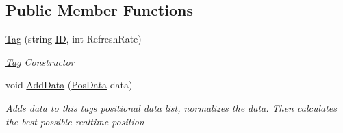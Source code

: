 \subsection*{Public Member Functions}
\begin{DoxyCompactItemize}
\item 
\hyperlink{class_pozyx_positioner_1_1_framework_1_1_tag_a9b58a1a5756bf3c8cda1e2afd32276b2}{Tag} (string \hyperlink{class_pozyx_positioner_1_1_framework_1_1_tag_a0d75eeca4dea7088e2b4a60230c13012}{ID}, int Refresh\+Rate)
\begin{DoxyCompactList}\small\item\em \hyperlink{class_pozyx_positioner_1_1_framework_1_1_tag}{Tag} Constructor \end{DoxyCompactList}\item 
void \hyperlink{class_pozyx_positioner_1_1_framework_1_1_tag_ac2741e137c420ad71f64ee2d3d5fefe8}{Add\+Data} (\hyperlink{struct_pozyx_positioner_1_1_framework_1_1_pos_data}{Pos\+Data} data)
\begin{DoxyCompactList}\small\item\em Adds data to this tag\textquotesingle{}s positional data list, normalizes the data. Then calculates the best possible realtime position \end{DoxyCompactList}\end{DoxyCompactItemize}
